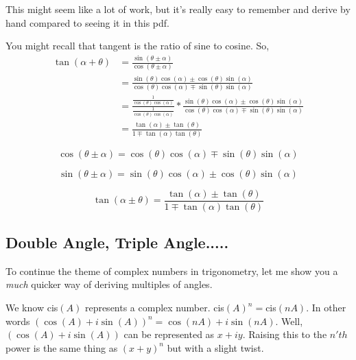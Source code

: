 \documentclass{article}
\begin{document}
\vspace{5mm}
\noindent This might seem like a lot of work, but it's really easy to remember and derive by hand compared to seeing it in this pdf.

\vspace{5mm}
\pagebreak
\noindent You might recall that tangent is the ratio of sine to cosine. So,
\begin{align*}
\tan(\alpha + \theta) &= \frac{\sin( \theta \pm \alpha)}{\cos(\theta \pm \alpha)} \\
&= \frac{\sin(\theta) \cos(\alpha) \pm \cos(\theta) \sin(\alpha)}{\cos(\theta) \cos(\alpha) \mp \sin(\theta) \sin(\alpha)} \\
&= \frac{\frac{1}{\cos(\theta)\cos(\alpha)}}{\frac{1}{\cos(\theta)\cos(\alpha)}} * \frac{\sin(\theta) \cos(\alpha) \pm \cos(\theta) \sin(\alpha)}{\cos(\theta) \cos(\alpha) \mp \sin(\theta) \sin(\alpha)} \\
&= \frac{\tan(\alpha)\pm\tan(\theta)}{1\mp\tan(\alpha)\tan(\theta)}
\end{align*}





\vspace{5mm}
\begin{theorem}


\vspace{5mm}
\noindent $$\cos(\theta\pm\alpha) = \cos(\theta)\cos(\alpha)\mp\sin(\theta)\sin(\alpha)$$

\vspace{5mm}
\noindent $$\sin(\theta\pm\alpha) = \sin(\theta)\cos(\alpha)\pm\cos(\theta)\sin(\alpha)$$

\vspace{5mm}
\noindent $$\tan(\alpha\pm\theta) = \frac{\tan(\alpha)\pm\tan(\theta)}{1\mp\tan(\alpha)\tan(\theta)}$$


\end{theorem}



\subsection{Double Angle, Triple Angle.....}
\noindent To continue the theme of complex numbers in trigonometry, let me show you a \textit{much} quicker way of deriving multiples of angles. 

\vspace{5mm}
\noindent We know cis$(A)$ represents a complex number. cis$(A)^n = $cis$(nA)$. In other words $(\cos(A)+i\sin(A))^n=\cos(nA)+i\sin(nA)$. Well,  $(\cos(A)+i\sin(A))$ can be represented as $x+iy$. Raising this to the $n'th$ power is the same thing as $(x+y)^n$ but with a slight twist. 
\end{document}

